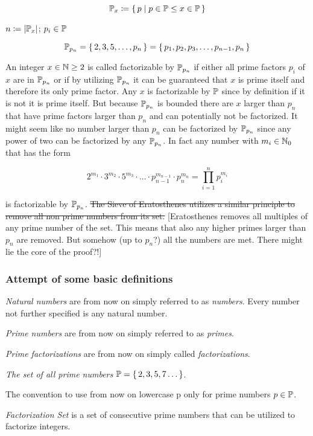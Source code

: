 \documentclass[a4paper,10pt]{article}
\begin{document}
$$\mathbb{P}_{x} \coloneq \lbrace \, { {p} \;|\; {p \in \mathbb{P} \leq x \in \mathbb{P}} } \, \rbrace$$

$n \coloneq |\mathbb{P}_x|$; $p_i \in \mathbb{P}$

$$\mathbb{P}_{p_n}
= \lbrace \, {2, 3, 5, \dots, p_n} \, \rbrace
= \lbrace \, {p_1, p_2, p_3, \dots, p_{n-1}, p_n} \, \rbrace$$

An integer $x \in \mathbb{N} \geq 2$ is called factorizable by $\mathbb{P}_{p_n}$
if either all prime factors $p_i$ of $x$ are in $\mathbb{P}_{p_n}$
or if by utilizing $\mathbb{P}_{p_n}$ it can be guaranteed that $x$ is prime itself
and therefore its only prime factor.
Any $x$ is factorizable by $\mathbb{P}$ since by definition
if it is not it is prime itself.
But because $\mathbb{P}_{p_n}$ is bounded there are $x$ larger than $p_n$
that have prime factors larger than $p_n$ and can potentially not be factorized.
It might seem like no number larger than $p_n$ can be factorized by $\mathbb{P}_{p_n}$
since any power of two can be factorized by any $\mathbb{P}_{p_n}$.
In fact any number with $m_i \in \mathbb{N}_0$ that has the form

$$2^{m_1} \cdot 3^{m_2} \cdot 5^{m_3} \cdot \ldots \cdot p_{n-1}^{m_{n-1}} \cdot p_n^{m_n}
= \prod_{i=1}^n p_i^{m_i} $$

is factorizable by $\mathbb{P}_{p_n}$.
\st{The Sieve of Eratosthenes utilizes a similar principle
to remove all non prime numbers from its set.}
[Eratosthenes removes all multiples of any prime number of the set.
This means that also any higher primes larger than $p_n$ are removed.
But somehow (up to $p_n$?) all the numbers are met.
There might lie the core of the proof?!]


\subsubsection*{Attempt of some basic definitions}

\emph{Natural numbers} are from now on simply referred to as \emph{numbers}.
Every number not further specified is any natural number.

\emph{Prime numbers} are from now on simply referred to as \emph{primes}.

\emph{Prime factorizations} are from now on simply called \emph{factorizations}.

\emph{The set of all prime numbers} $\mathbb{P} = \lbrace \, {2, 3, 5, 7 \dots } \, \rbrace$.

The convention to use from now on lowercase p only for prime numbers $p \in \mathbb{P}$.

\emph{Factorization Set} is a set of consecutive prime numbers that can be utilized to factorize integers.
\end{document}
